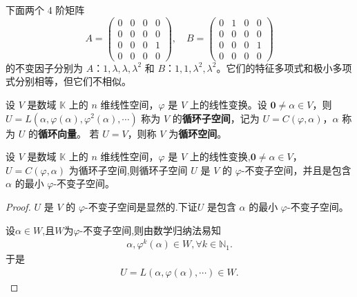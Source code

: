 \documentclass[../../main.tex]{subfiles}
\begin{document}
\begin{example}
下面两个 4 阶矩阵
\[
A = \begin{pmatrix}
0 & 0 & 0 & 0 \\
0 & 0 & 0 & 0 \\
0 & 0 & 0 & 1 \\
0 & 0 & 0 & 0
\end{pmatrix}, \quad
B = \begin{pmatrix}
0 & 1 & 0 & 0 \\
0 & 0 & 0 & 0 \\
0 & 0 & 0 & 1 \\
0 & 0 & 0 & 0
\end{pmatrix}
\]
的不变因子分别为 $A$：$1,\lambda,\lambda,\lambda^2$ 和 $B$：$1,1,\lambda^2,\lambda^2$。它们的特征多项式和极小多项式分别相等，但它们不相似。 
\end{example}

\begin{definition}[循环子空间]\label{definition:循环子空间和循环空间}
设 \(V\) 是数域 \(\mathbb{K}\) 上的 \(n\) 维线性空间，\(\varphi\) 是 \(V\) 上的线性变换。设 \(\mathbf{0}\neq\alpha\in V\)，则 \(U = L(\alpha,\varphi(\alpha),\varphi^2(\alpha),\cdots)\) 称为 \(V\) 的\textbf{循环子空间}，记为 \(U = C(\varphi,\alpha)\)，\(\alpha\) 称为 \(U\) 的\textbf{循环向量}。
若 \(U = V\)，则称 \(V\) 为\textbf{循环空间}。 
\end{definition}

\begin{theorem}[循环子空间的基本性质]\label{theorem:循环子空间的基本性质}
设 \(V\) 是数域 \(\mathbb{K}\) 上的 \(n\) 维线性空间，\(\varphi\) 是 \(V\) 上的线性变换,\(\mathbf{0}\neq\alpha\in V\)， \(U = C(\varphi,\alpha)\) 为循环子空间,则循环子空间 \(U\) 是 \(V\) 的 \(\varphi\)-不变子空间，并且是包含 \(\alpha\) 的最小 \(\varphi\)-不变子空间。
\end{theorem}
\begin{proof}
\(U\) 是 \(V\) 的 \(\varphi\)-不变子空间是显然的.下证\(U\) 是包含 \(\alpha\) 的最小 \(\varphi\)-不变子空间。

设$\alpha \in W$,且$W$为$\varphi$-不变子空间,则由数学归纳法易知
\begin{align*}
\alpha,\varphi^k(\alpha)\in W,\forall k\in \mathbb{N}_1.
\end{align*}
于是
\begin{align*}
U=L(\alpha,\varphi(\alpha),\cdots)\in W.
\end{align*}

\end{proof}
\end{document}
